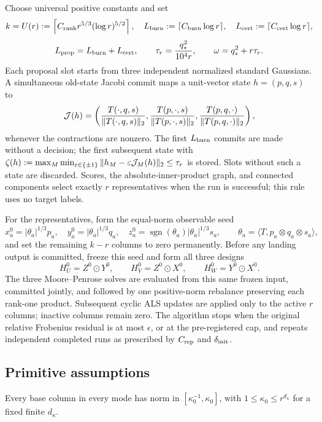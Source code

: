 Choose universal positive constants and set
\[
 k=U(r):=\left\lceil C_{\rm rank}r^{5/3}(\log r)^{5/2}\right\rceil,
 \quad L_{\rm burn}:=\lceil C_{\rm burn}\log r\rceil,
 \quad L_{\rm cert}:=\lceil C_{\rm cert}\log r\rceil,
\]
\[
 L_{\rm prop}=L_{\rm burn}+L_{\rm cert},\qquad
 \tau_r={q_*^2\over10^4r},\qquad \omega=q_*^2+r\tau_r.
\]
Each proposal slot starts from three independent normalized standard
Gaussians. A simultaneous old-state Jacobi commit maps a unit-vector state
$h=(p,q,s)$ to
\[
 {\cal J}(h)=\left({T(\cdot,q,s)\over\|T(\cdot,q,s)\|_2},
 {T(p,\cdot,s)\over\|T(p,\cdot,s)\|_2},
 {T(p,q,\cdot)\over\|T(p,q,\cdot)\|_2}\right),
\]
whenever the contractions are nonzero. The first $L_{\rm burn}$ commits are
made without a decision; the first subsequent state with
$\zeta(h):=\max_M\min_{\varepsilon\in\{\pm1\}}
\|h_M-\varepsilon{\cal J}_M(h)\|_2\le\tau_r$ is stored. Slots without
such a state are discarded. Scores, the absolute-inner-product graph, and
connected components select exactly $r$ representatives when the run is
successful; this rule uses no target labels.

For the representatives, form the equal-norm observable seed
\[
 x_a^0=|\theta_a|^{1/3}p_a,\quad y_a^0=|\theta_a|^{1/3}q_a,\quad
 z_a^0=\operatorname{sgn}(\theta_a)|\theta_a|^{1/3}s_a,
 \qquad \theta_a=\langle T,p_a\otimes q_a\otimes s_a\rangle,
\]
and set the remaining $k-r$ columns to zero permanently. Before any
landing output is committed, freeze this seed and form all three designs
\[
 H_U^0=Z^0\odot Y^0,\qquad H_V^0=Z^0\odot X^0,\qquad
 H_W^0=Y^0\odot X^0.
\]
The three Moore--Penrose solves are evaluated from this same frozen input,
committed jointly, and followed by one positive-norm rebalance preserving
each rank-one product. Subsequent cyclic ALS updates are applied only to the
active $r$ columns; inactive columns remain zero. The algorithm stops when
the original relative Frobenius residual is at most $\epsilon$, or at the
pre-registered cap, and repeats independent completed runs as prescribed by
$C_{\rm rep}$ and $\delta_{\rm init}$.

\subsection{Primitive assumptions}

\begin{assumption}\label{assump:base-scale}
Every base column in every mode has norm in
$[\kappa _0^{-1},\kappa _0]$, with
$1\le\kappa _0\le r^{d_\kappa}$ for a fixed finite $d_\kappa$.
\end{assumption}

